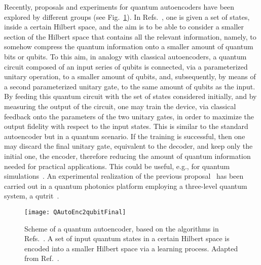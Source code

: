 \documentclass[12pt]{iopart}
\begin{document}
Recently, proposals and experiments for quantum autoencoders have been explored by different groups (see Fig.~\ref{Qauto1}). In Refs.~\cite{AlanAutoencoder,KimAutoencoder}, one is given a set of states, inside a certain Hilbert space, and the aim is to be able to consider a smaller section of the Hilbert space that contains all the relevant information, namely, to somehow compress the quantum information onto a smaller amount of quantum bits or qubits. To this aim, in analogy with classical autoencoders, a quantum circuit composed of an input series of qubits is connected, via a parameterized unitary operation, to a smaller amount of qubits, and, subsequently, by means of a second parameterized unitary gate, to the same amount of qubits as the input. By feeding this quantum circuit with the set of states considered initially, and by measuring the output of the circuit, one may train the device, via classical feedback onto the parameters of the two unitary gates, in order to maximize the output fidelity with respect to the input states. This is similar to the standard autoencoder but in a quantum scenario. If the training is successful, then one may discard the final unitary gate, equivalent to the decoder, and keep only the initial one, the encoder, therefore reducing the amount of quantum information needed for practical applications. This could be useful, e.g., for quantum simulations~\cite{AlanAutoencoder}. An experimental realization of the previous proposal~\cite{AlanAutoencoder} has been carried out in a quantum photonics platform employing a three-level quantum system, a qutrit~\cite{TischlerAutoencoder}.


\begin{figure}[h!]
\begin{center}
\texttt{[image: QAutoEnc2qubitFinal]}
\caption{Scheme of a quantum autoencoder, based on the algorithms in Refs.~\cite{AlanAutoencoder,KimAutoencoder}.  A set of input quantum states in a certain Hilbert space is encoded into a smaller Hilbert space via a learning process. Adapted from Ref.~\cite{LamataAutoencoder}.}
\label{Qauto1}
\end{center}
\end{figure} 
\end{document}
